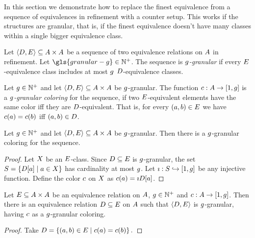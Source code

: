 
In this section we demonstrate how to replace the finest equivalence from a
sequence of equivalences in refinement with a counter setup. This works if the
structures are granular, that is, if the finest equivalence doesn't have many
classes within a single bigger equivalence class.

\begin{definition}
Let $\left\langle D,E \right\rangle \subseteq {A\times A}$ be a sequence of two
equivalence relations on $A$ in refinement.
Let $\gls{granular-g} \in \pNats$.
The sequence is \emph{$g$-granular} if every $E$-equivalence class
includes at most $g$ $D$-equivalence classes.
\end{definition}
\begin{definition}
Let $g \in \mathbb{N}^{+}$ and let $\left\langle D,E \right\rangle \subseteq {A\times A}$ be
$g$-granular.
The function $c : A \to [1,g]$ is a \emph{$g$-granular coloring} for
the sequence,
if two $E$-equivalent elements have the same color iff they are
$D$-equivalent.
That is, for every $(a,b) \in E$ we have
$c(a) = c(b)$ iff $(a,b) \in D$.
\end{definition}
\begin{remark}\label{rem:granular-exists}
Let $g \in \mathbb{N}^{+}$ and let $\left\langle D,E \right\rangle \subseteq {A\times A}$ be
$g$-granular.
Then there is a $g$-granular coloring for the sequence.
\end{remark}
\begin{proof}
Let $X$ be an $E$-class.
Since $D \subseteq E$ is $g$-granular,
the set $S = \left\{D[a]\mathrel{}\middle|\mathrel{}a \in X\right\}$ has cardinality at most
$g$.
Let $\imath : S \hookrightarrow [1,g]$ be any injective function.
Define the color $c$ on $X$ as $c(a) = \imath D[a]$.
\end{proof}

\begin{remark}\label{rem:granular-color}
Let $E \subseteq {A\times A}$ be an equivalence relation on $A$,
$g \in \mathbb{N}^{+}$ and $c : A \to [1,g]$.
Then there is an equivalence relation $D \subseteq E$ on $A$ such
that $\left\langle D,E \right\rangle$ is $g$-granular, having $c$ as a $g$-granular
coloring.
\end{remark}
\begin{proof}
Take $D = \left\{(a,b) \in E\mathrel{}\middle|\mathrel{}c(a) = c(b)\right\}.$
\end{proof}


